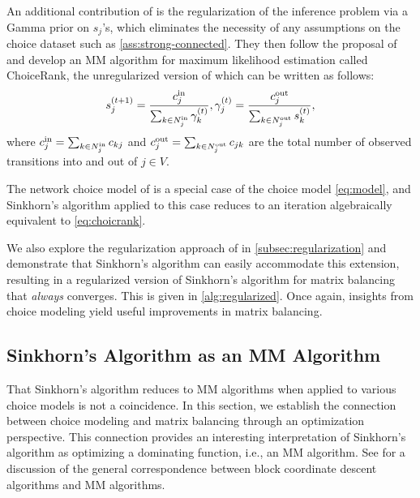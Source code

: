 An additional contribution of \citet{maystre2017choicerank} is the regularization of the inference problem via a Gamma prior on $s_j$'s, which eliminates the necessity of any assumptions on the choice dataset such as \cref{ass:strong-connected}. They then follow the proposal of \citet{hunter2004mm} and develop an MM algorithm for maximum likelihood estimation called ChoiceRank, the unregularized version of which can be written as follows:
\begin{align}
    \label{eq:choicrank}
    s_j^{(t+1)} = \frac{c_j^{\text{in}}}{\sum_{k\in N_j^{\text{in}}} \gamma_k^{(t)}}, \gamma_j^{(t)}=\frac{c_j^{\text{out}}}{\sum_{k\in N_j^{\text{out}}}s_k^{(t)}},
\end{align}
where $c_j^{\text{in}}=\sum_{k\in N_j^{\text{in}}}c_{kj}$ and $c_j^{\text{out}}=\sum_{k\in N_j^{\text{out}}}c_{jk}$ are the total number of observed transitions into and out of $j\in V$. 
\begin{proposition}
    \label{prop:choicerank}
   The network choice model of \citet{maystre2017choicerank} is a special case of the choice model \eqref{eq:model}, and  Sinkhorn's algorithm applied to this case reduces to an iteration algebraically equivalent to \eqref{eq:choicrank}.
\end{proposition}
We also explore the regularization approach of \citet{maystre2017choicerank} in \cref{subsec:regularization} and demonstrate that Sinkhorn's algorithm can easily accommodate this extension, resulting in a regularized version of Sinkhorn's algorithm for matrix balancing that \emph{always} converges. This is given in \cref{alg:regularized}. Once again, insights from choice modeling yield useful improvements in matrix balancing.

\subsection{Sinkhorn's Algorithm as an MM Algorithm}
\label{sec:sinkhorn-MM}
That Sinkhorn's algorithm reduces to MM algorithms when applied to various choice models is not a coincidence. 
In this section, we establish the connection between choice modeling
and matrix balancing through an optimization perspective. This connection
provides an interesting interpretation of Sinkhorn's algorithm
as optimizing a dominating function, i.e., an MM algorithm. See \citet{lange2000optimization,lange2016mm} for a discussion of the general correspondence between block
coordinate descent algorithms and MM algorithms.

